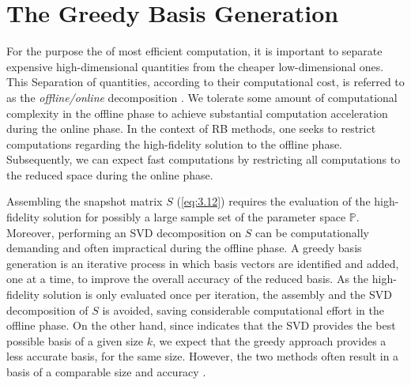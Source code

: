 \section{The Greedy Basis Generation} \label{sec:3.3} 
For the purpose the of most efficient computation, it is important to separate expensive high-dimensional quantities from the cheaper low-dimensional ones. This Separation of quantities, according to their computational cost, is referred to as the \emph{offline/online} decomposition \cite{quarteroni2015reduced}. We tolerate some amount of computational complexity in the offline phase to achieve substantial computation acceleration during the online phase. In the context of RB methods, one seeks to restrict computations regarding the high-fidelity solution to the offline phase. Subsequently, we can expect fast computations by restricting all computations to the reduced space during the online phase.

Assembling the snapshot matrix $S$ (\ref{eq:3.12}) requires the evaluation of the high-fidelity solution for possibly a large sample set of the parameter space $\mathbb P$. Moreover, performing an SVD decomposition on $S$ can be computationally demanding and often impractical during the offline phase. A greedy basis generation is an iterative process in which basis vectors are identified and added, one at a time, to improve the overall accuracy of the reduced basis. As the high-fidelity solution is only evaluated once per iteration, the assembly and the SVD decomposition of $S$ is avoided, saving considerable computational effort in the offline phase. On the other hand, since  indicates that the SVD provides the best possible basis of a given size $k$, we expect that the greedy approach provides a less accurate basis, for the same size. However, the two methods often result in a basis of a comparable size and accuracy \cite{quarteroni2015reduced}.

